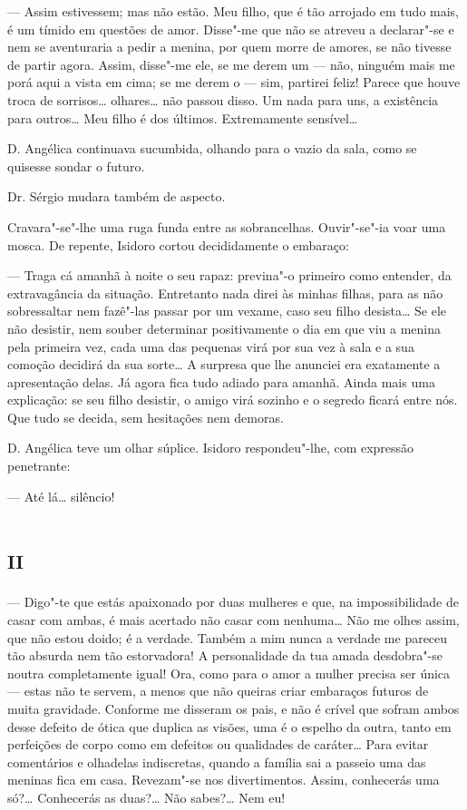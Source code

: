 --- Assim estivessem; mas não estão. Meu filho, que é tão arrojado em
tudo mais, é um tímido em questões de amor. Disse"-me que não se atreveu
a declarar"-se e nem se aventuraria a pedir a menina, por quem morre de
amores, se não tivesse de partir agora. Assim, disse"-me ele, se me derem
um --- não, ninguém mais me porá aqui a vista em cima; se me derem o ---
sim, partirei feliz! Parece que houve troca de sorrisos\ldots{} olhares\ldots{}
não passou disso. Um nada para uns, a existência para outros\ldots{} Meu
filho é dos últimos. Extremamente sensível\ldots{}

D. Angélica continuava sucumbida, olhando para o vazio da sala, como se
quisesse sondar o futuro.

Dr. Sérgio mudara também de aspecto.

Cravara"-se"-lhe uma ruga funda entre as sobrancelhas. Ouvir"-se"-ia voar
uma mosca. De repente, Isidoro cortou decididamente o embaraço:

--- Traga cá amanhã à noite o seu rapaz: previna"-o primeiro como
entender, da extravagância da situação. Entretanto nada direi às minhas
filhas, para as não sobressaltar nem fazê"-las passar por um vexame, caso
seu filho desista\ldots{} Se ele não desistir, nem souber determinar
positivamente o dia em que viu a menina pela primeira vez, cada uma das
pequenas virá por sua vez à sala e a sua comoção decidirá da sua
sorte\ldots{} A surpresa que lhe anunciei era exatamente a apresentação
delas. Já agora fica tudo adiado para amanhã. Ainda mais uma explicação:
se seu filho desistir, o amigo virá sozinho e o segredo ficará entre
nós. Que tudo se decida, sem hesitações nem demoras.

D. Angélica teve um olhar súplice. Isidoro respondeu"-lhe, com expressão
penetrante:

--- Até lá\ldots{} silêncio!

\section*{\textsc{ii}}

--- Digo"-te que estás apaixonado por duas mulheres e que, na
impossibilidade de casar com ambas, é mais acertado não casar com
nenhuma\ldots{} Não me olhes assim, que não estou doido; é a verdade. Também
a mim nunca a verdade me pareceu tão absurda nem tão estorvadora! A
personalidade da tua amada desdobra"-se noutra completamente igual! Ora,
como para o amor a mulher precisa ser única --- estas não te servem, a
menos que não queiras criar embaraços futuros de muita gravidade.
Conforme me disseram os pais, e não é crível que sofram ambos desse
defeito de ótica que duplica as visões, uma é o espelho da outra, tanto
em perfeições de corpo como em defeitos ou qualidades de caráter\ldots{} Para
evitar comentários e olhadelas indiscretas, quando a família sai a
passeio uma das meninas fica em casa. Revezam"-se nos divertimentos.
Assim, conhecerás uma só?\ldots{} Conhecerás as duas?\ldots{} Não sabes?\ldots{} Nem
eu!

